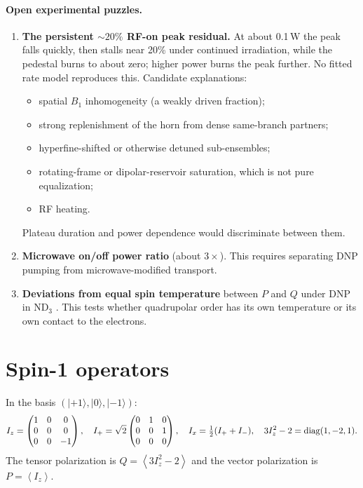 \documentclass[11pt]{article}
\newcommand{\ket}[1]{\lvert #1\rangle}
\newcommand{\avg}[1]{\left\langle #1\right\rangle}
\begin{document}
\paragraph{Open experimental puzzles.}
\begin{enumerate}
\item \textbf{The persistent $\sim20\%$ RF-on peak residual.} At about 0.1\,W the peak falls
quickly, then stalls near 20\% under continued irradiation, while the pedestal burns to about
zero; higher power burns the peak further. No fitted rate model reproduces this. Candidate
explanations:
\begin{itemize}
\item spatial $B_1$ inhomogeneity (a weakly driven fraction);
\item strong replenishment of the horn from dense same-branch partners;
\item hyperfine-shifted or otherwise detuned sub-ensembles;
\item rotating-frame or dipolar-reservoir saturation, which is not pure equalization;
\item RF heating.
\end{itemize}
Plateau duration and power dependence would discriminate between them.

\item \textbf{Microwave on/off power ratio} (about $3\times$). This requires separating DNP
pumping from microwave-modified transport.

\item \textbf{Deviations from equal spin temperature} between $P$ and $Q$ under DNP in
ND$_3$ \cite{Keller2017}. This tests whether quadrupolar order has its own temperature or its
own contact to the electrons.
\end{enumerate}

\appendix
\section{Spin-1 operators}
In the basis $(\ket{+1},\ket{0},\ket{-1})$:
\[
I_z=\begin{pmatrix}1&0&0\\0&0&0\\0&0&-1\end{pmatrix},\quad
I_+=\sqrt2\begin{pmatrix}0&1&0\\0&0&1\\0&0&0\end{pmatrix},\quad
I_x=\tfrac12(I_++I_-),\quad 3I_z^2-2={\rm diag}(1,-2,1).
\]
The tensor polarization is $Q=\avg{3I_z^2-2}$ and the vector polarization is $P=\avg{I_z}$.
\end{document}

